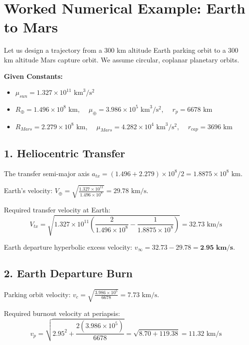 \documentclass[12pt]{article}
\begin{document}
\newpage

\section*{Worked Numerical Example: Earth to Mars}
Let us design a trajectory from a 300 km altitude Earth parking orbit to a 300 km altitude Mars capture orbit. We assume circular, coplanar planetary orbits.

\textbf{Given Constants:}
\begin{itemize}
    \item $\mu_{sun} = 1.327 \times 10^{11} \text{ km}^3/\text{s}^2$
    \item $R_{\oplus} = 1.496 \times 10^8 \text{ km}$, $\quad \mu_{\oplus} = 3.986 \times 10^5 \text{ km}^3/\text{s}^2$, $\quad r_{p} = 6678 \text{ km}$
    \item $R_{Mars} = 2.279 \times 10^8 \text{ km}$, $\quad \mu_{Mars} = 4.282 \times 10^4 \text{ km}^3/\text{s}^2$, $\quad r_{cap} = 3696 \text{ km}$
\end{itemize}

\subsection*{1. Heliocentric Transfer}
The transfer semi-major axis $a_{tx} = (1.496 + 2.279) \times 10^8 / 2 = 1.8875 \times 10^8 \text{ km}$.

Earth's velocity: $V_{\oplus} = \sqrt{\frac{1.327 \times 10^{11}}{1.496 \times 10^8}} = 29.78 \text{ km/s}$.

Required transfer velocity at Earth: 
\begin{equation*}
    V_{tx} = \sqrt{1.327 \times 10^{11} \left( \frac{2}{1.496 \times 10^8} - \frac{1}{1.8875 \times 10^8} \right)} = 32.73 \text{ km/s}
\end{equation*}

Earth departure hyperbolic excess velocity: $v_{\infty} = 32.73 - 29.78 = \textbf{2.95 km/s}$.

\subsection*{2. Earth Departure Burn}
Parking orbit velocity: $v_c = \sqrt{\frac{3.986 \times 10^5}{6678}} = 7.73 \text{ km/s}$.

Required burnout velocity at periapsis:
\begin{equation*}
    v_p = \sqrt{2.95^2 + \frac{2(3.986 \times 10^5)}{6678}} = \sqrt{8.70 + 119.38} = 11.32 \text{ km/s}
\end{equation*}
\end{document}
